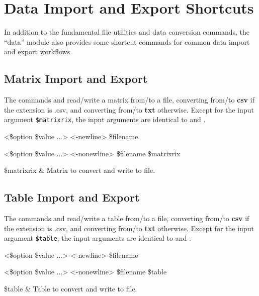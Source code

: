 \section{Data Import and Export Shortcuts}
In addition to the fundamental file utilities and data conversion commands, the ``data'' module also provides some shortcut commands for common data import and export workflows.
\subsection{Matrix Import and Export}
The commands  and  read/write a matrix from/to a file, converting from/to \textbf{csv} if the extension is .csv, and converting from/to \textbf{txt} otherwise.
Except for the input argument \texttt{\$matrixrix}, the input arguments are identical to  and .
\begin{syntax}
 <\$option \$value ...> <-newline> \$filename
\end{syntax}
\begin{syntax}
 <\$option \$value ...> <-nonewline> \$filename \$matrixrix
\end{syntax}
\begin{args}
\$matrixrix & Matrix to convert and write to file.
\end{args}
\subsection{Table Import and Export}
The commands  and  read/write a table from/to a file, converting from/to \textbf{csv} if the extension is .csv, and converting from/to \textbf{txt} otherwise.
Except for the input argument \texttt{\$table}, the input arguments are identical to  and .
\begin{syntax}
 <\$option \$value ...> <-newline> \$filename
\end{syntax}
\begin{syntax}
 <\$option \$value ...> <-nonewline> \$filename \$table
\end{syntax}
\begin{args}
\$table & Table to convert and write to file.
\end{args}
\clearpage





